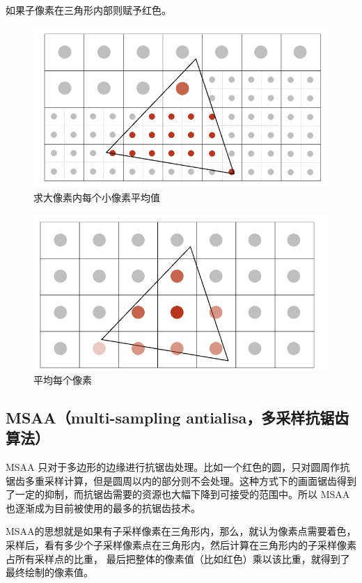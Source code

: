 如果子像素在三角形内部则赋予红色。

\begin{figure}[H]
    \centering
    \includegraphics[scale=0.3]{figures/SSAA3.png}
    \caption{求大像素内每个小像素平均值}
\end{figure}

\begin{figure}[H]
    \centering
    \includegraphics[scale=0.3]{figures/SSAA4.png}
    \caption{平均每个像素}
\end{figure}

\subsection*{MSAA（multi-sampling antialisa，多采样抗锯齿算法）}

MSAA 只对于多边形的边缘进行抗锯齿处理。比如一个红色的圆，只对圆周作抗锯齿多重采样计算，但是圆周以内的部分则不会处理。这种方式下的画面锯齿得到了一定的抑制，而抗锯齿需要的资源也大幅下降到可接受的范围中。所以 MSAA 也逐渐成为目前被使用的最多的抗锯齿技术。

MSAA的思想就是如果有子采样像素在三角形内，那么，就认为像素点需要着色，采样后，看有多少个子采样像素点在三角形内，然后计算在三角形内的子采样像素占所有采样点的比重，
最后把整体的像素值（比如红色）乘以该比重，就得到了最终绘制的像素值。

